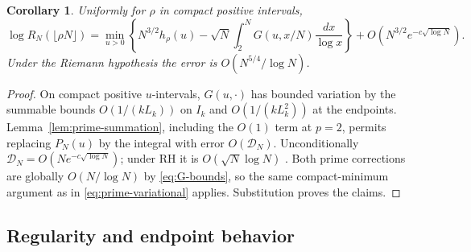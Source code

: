 \documentclass[11pt]{amsart}
\newtheorem{corollary}[theorem]{Corollary}
\theoremstyle{remark}
\begin{document}
\begin{corollary}\label{cor:prime-integral}
Uniformly for \(\rho\) in compact positive intervals,
\[
 \log R_N(\lfloor\rho N\rfloor)
 =\min_{u>0}\left\{N^{3/2}h_\rho(u)
    -\sqrt N\int_2^N G(u,x/N)\frac{dx}{\log x}\right\}
       +O(N^{3/2}e^{-c\sqrt{\log N}}).
\]
Under the Riemann hypothesis the error is \(O(N^{5/4}/\log N)\).
\end{corollary}
\begin{proof}
On compact positive \(u\)-intervals, \(G(u,\cdot)\) has bounded
variation by the summable bounds \(O(1/(kL_k))\) on \(I_k\) and
\(O(1/(kL_k^2))\) at the endpoints.
Lemma~\ref{lem:prime-summation}, including the \(O(1)\) term at \(p=2\),
permits replacing \(P_N(u)\) by the integral with error
\(O(\mathcal D_N)\). Unconditionally \(\mathcal D_N=O(Ne^{-c\sqrt{\log N}})\);
under RH it is \(O(\sqrt N\log N)\) \cite[(6.14) and (13.4)]{montgomery-vaughan}.
Both prime corrections are globally \(O(N/\log N)\) by
\eqref{eq:G-bounds}, so the same compact-minimum argument as in
\eqref{eq:prime-variational} applies. Substitution proves the claims.
\end{proof}


\subsection{Regularity and endpoint behavior}
\end{document}
